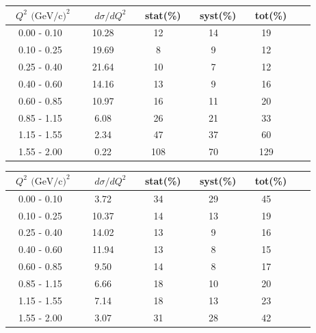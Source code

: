 \documentclass[aps, prd, reprint,showpacs,  preprintnumbers,amsmath,amssymb,superscriptaddress, nofootinbib]{revtex4-1}
\makeatletter
\renewenvironment{table}
  {\def\@captype{table}}
  {}
\makeatother
\begin{document}
\begin{table}
\centering
\begin{tabular}{ccccccc}
\hline
~$Q^2$ $\text{(GeV/c)}^2$ &~~ $d\sigma/dQ^2$ &~ stat(\%) &~ syst(\%) &~ tot(\%)  \\
\hline
   0.00 - 0.10 &  10.28 &   12 &   14 &   19 \\
   0.10 - 0.25 &  19.69 &    8 &    9 &   12 \\
   0.25 - 0.40 &  21.64 &   10 &    7 &   12 \\
   0.40 - 0.60 &  14.16 &   13 &    9 &   16 \\
   0.60 - 0.85 &  10.97 &   16 &   11 &   20 \\
   0.85 - 1.15 &   6.08 &   26 &   21 &   33 \\
   1.15 - 1.55 &   2.34 &   47 &   37 &   60 \\
   1.55 - 2.00 &   0.22 &  108 &   70 &  129 \\
\hline\hline
\end{tabular}
\caption{ Flux-averaged differential cross section in $Q^2$ with the selection $1.5<E_{\nu}<4.0$\,GeV:
$d\sigma/dQ^2 (10^{-40}\text{cm}^2/\text{nucleon}/(\text{GeV/c})^2)$, 
for $\pi^0$+nucleon(s) production with statistical (stat), systematic (syst), and total (tot) uncertainties.}
\label{tb:piz-Q2}
\end{table}
\smallskip
\smallskip
\smallskip
\smallskip
\smallskip
\smallskip
\smallskip
\smallskip

\begin{table}
\centering
\begin{tabular}{ccccccc}
\hline
~$Q^2$ $\text{(GeV/c)}^2$ &~~ $d\sigma/dQ^2$ &~ stat(\%) &~ syst(\%) &~ tot(\%)  \\
\hline
   0.00 - 0.10 &   3.72 &   34 &   29 &   45 \\
   0.10 - 0.25 &  10.37 &   14 &   13 &   19 \\
   0.25 - 0.40 &  14.02 &   13 &    9 &   16 \\
   0.40 - 0.60 &  11.94 &   13 &    8 &   15 \\
   0.60 - 0.85 &   9.50 &   14 &    8 &   17 \\
   0.85 - 1.15 &   6.66 &   18 &   10 &   20 \\
   1.15 - 1.55 &   7.14 &   18 &   13 &   23 \\
   1.55 - 2.00 &   3.07 &   31 &   28 &   42 \\
\hline\hline
\end{tabular}
\caption{ Flux-averaged differential cross section in $Q^2$ with the selection $4.0 < E_{\nu} < 10.0$\,GeV:
$d\sigma/dQ^2 (10^{-40}\text{cm}^2/\text{nucleon}/(\text{GeV/c})^2)$, 
for $\pi^0$+nucleon(s) production with statistical (stat), systematic (syst), and total (tot) uncertainties.}
\label{tb:piz-Q2}
\end{table}
\smallskip
\smallskip
\smallskip
\smallskip
\smallskip
\smallskip
\smallskip
\smallskip
\end{document}
